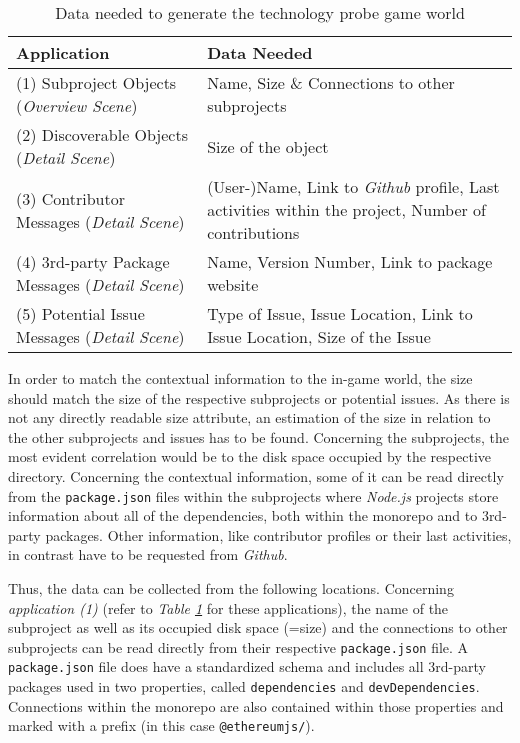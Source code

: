 \begin{table}[h]
  \begin{tabularx}{\textwidth}{| X | X |}
    \hline
    \textbf{Application}                                   & \textbf{Data Needed}                                                                                      \\ \hline
    (1) Subproject Objects (\textit{Overview Scene})       & Name, Size \& Connections to other subprojects                                                            \\ \hline
    (2) Discoverable Objects (\textit{Detail Scene})       & Size of the object                                                                                        \\ \hline
    (3) Contributor Messages (\textit{Detail Scene})       & (User-)Name, Link to \textit{Github} profile, Last activities within the project, Number of contributions \\ \hline
    (4) 3rd-party Package Messages (\textit{Detail Scene}) & Name, Version Number, Link to package website                                                             \\ \hline
    (5) Potential Issue Messages (\textit{Detail Scene})   & Type of Issue, Issue Location, Link to Issue Location, Size of the Issue                                  \\ \hline
  \end{tabularx}
  \caption{\label{tab:probe-data}Data needed to generate the technology probe game world}
\end{table}

In order to match the contextual information to the in-game world, the size should match the size of the respective subprojects or potential issues. As there is not any directly readable size attribute, an estimation of the size in relation to the other subprojects and issues has to be found. Concerning the subprojects, the most evident correlation would be to the disk space occupied by the respective directory. Concerning the contextual information, some of it can be read directly from the \verb|package.json| files within the subprojects where \textit{Node.js} projects store information about all of the dependencies, both within the monorepo and to 3rd-party packages. Other information, like contributor profiles or their last activities, in contrast have to be requested from \textit{Github}.

Thus, the data can be collected from the following locations. Concerning \textit{application (1)} (refer to \textit{Table \ref{tab:probe-data}} for these applications), the name of the subproject as well as its occupied disk space (=size) and the connections to other subprojects can be read directly from their respective \verb|package.json| file. A \verb|package.json| file does have a standardized schema and includes all 3rd-party packages used in two properties, called \verb|dependencies| and \verb|devDependencies|. Connections within the monorepo are also contained within those properties and marked with a prefix (in this case \verb|@ethereumjs/|).

